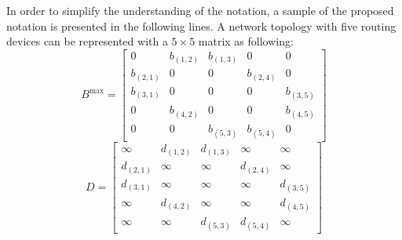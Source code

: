 \documentclass[10pt, journal, letterpaper]{IEEEtran}
\begin{document}
In order to simplify the understanding of the notation, a sample of the proposed notation is presented in the following lines. A network topology with five routing devices can be represented with a $5\times5$ matrix as following:
\[B^{\max}=
  \begin{bmatrix}
    0 & b_{(1,2)} & b_{(1,3)} & 0 & 0\\
    b_{(2,1)} & 0 & 0 & b_{(2,4)} & 0\\
    b_{(3,1)} & 0 & 0 & 0 & b_{(3,5)}\\
    0 & b_{(4,2)} & 0 & 0 & b_{(4,5)}\\
    0 & 0 & b_{(5,3)} & b_{(5,4)} & 0
  \end{bmatrix}\]
\[D=
  \begin{bmatrix}
    \infty & d_{(1,2)} & d_{(1,3)} & \infty & \infty\\
    d_{(2,1)} & \infty & \infty & d_{(2,4)} & \infty\\
    d_{(3,1)} & \infty & \infty & \infty & d_{(3,5)}\\
    \infty & d_{(4,2)} & \infty & \infty & d_{(4,5)}\\
    \infty & \infty & d_{(5,3)} & d_{(5,4)} & \infty
  \end{bmatrix}\]
  
\end{document}
